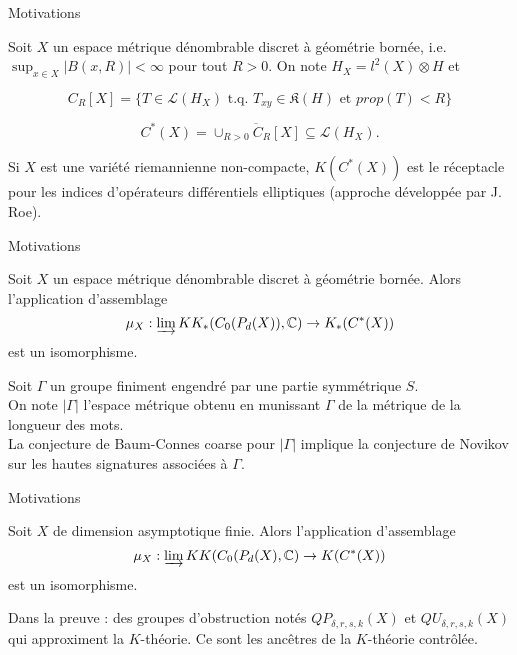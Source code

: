 \begin{frame}{Motivations}

Soit $X$ un espace métrique dénombrable discret à géométrie bornée, i.e. $\sup_{x\in X} |B(x,R)|<\infty$ pour tout $R>0$. On note $H_X = l^2(X)\otimes H$ et 

\[C_R[X] = \{T\in \mathcal L(H_X) \text{ t.q. } T_{xy} \in \mathfrak K(H) \text{ et } prop(T) < R \}\]

\begin{definitionfr}
\[C^*(X) = \overline{\cup_{R>0} C_R[X]} \subseteq \mathcal L(H_X).\]
\end{definitionfr}
\vspace{0.3 cm}
Si $X$ est une variété riemannienne non-compacte, $K(C^*(X))$ est le réceptacle pour les indices d'opérateurs différentiels elliptiques (approche développée par J. Roe).
\end{frame}

\begin{frame}{Motivations}
\begin{conj}
Soit $X$ un espace métrique dénombrable discret à géométrie bornée. Alors l'application d'assemblage
\[\mu_X : \varinjlim KK_*(C_0(P_d(X)),\mathbb C) \rightarrow K_*(C^*(X))\]
est un isomorphisme.
\end{conj}

Soit $\Gamma$ un groupe finiment engendré par une partie symmétrique $S$. \\
\vspace{0.3 cm}
On note $|\Gamma|$ l'espace métrique obtenu en munissant $\Gamma$ de la métrique de la longueur des mots. \\
\vspace{0.3 cm}
La conjecture de Baum-Connes coarse pour $|\Gamma |$ implique la conjecture de Novikov sur les hautes signatures associées à $\Gamma$. 
\end{frame}

\begin{frame}{Motivations}

\begin{thmfr}[Yu, 2010 \cite{Yu1}]
Soit $X$ de dimension asymptotique finie. Alors l'application d'assemblage
\[\mu_X : \varinjlim KK(C_0(P_d(X),\mathbb C) \rightarrow K(C^*(X))\]
est un isomorphisme.
\end{thmfr}
\vspace{0.3 cm}
Dans la preuve : des groupes d'obstruction notés $QP_{\delta, r ,s, k}(X)$ et $QU_{\delta, r ,s, k}(X)$ qui approximent la $K$-théorie. Ce sont les ancêtres de la $K$-théorie contrôlée.\\

\end{frame}

